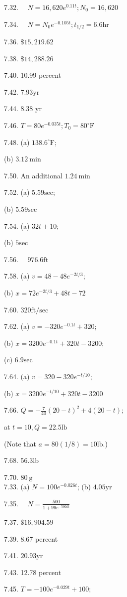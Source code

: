 \documentclass[10pt]{article}
\begin{document}
7.32. $\quad N=16,620 e^{0.11 t} ; N_{0}=16,620$

7.34. $\quad N=N_{0} e^{-0.105 t} ; t_{1 / 2}=6.6 \mathrm{hr}$

7.36. $\$ 15,219.62$

7.38. $\$ 14,288.26$

7.40. 10.99 percent

7.42. $7.93 \mathrm{yr}$

7.44. 8.38 yr

7.46. $T=80 e^{-0.035 t} ; T_{0}=80^{\circ} \mathrm{F}$

7.48. (a) $138.6^{\circ} \mathrm{F}$;

(b) $3.12 \mathrm{~min}$

7.50. An additional $1.24 \mathrm{~min}$

7.52. (a) $5.59 \mathrm{sec}$;

(b) $5.59 \mathrm{sec}$

7.54. (a) $32 t+10$;

(b) $5 \mathrm{sec}$

7.56. $\quad 976.6 \mathrm{ft}$

7.58. (a) $v=48-48 e^{-2 t / 3}$;

(b) $x=72 e^{-2 t / 3}+48 t-72$

7.60. $320 \mathrm{ft} / \mathrm{sec}$

7.62. (a) $v=-320 e^{-0.1 t}+320$;

(b) $x=3200 e^{-0.1 t}+320 t-3200$;

(c) $6.9 \mathrm{sec}$

7.64. (a) $v=320-320 e^{-t / 10}$;

(b) $x=3200 e^{-t / 10}+320 t-3200$

7.66. $Q=-\frac{7}{40}(20-t)^{2}+4(20-t)$;

at $t=10, Q=22.5 \mathrm{lb}$

(Note that $a=80(1 / 8)=10 \mathrm{lb}$.)

7.68. $56.3 \mathrm{lb}$

7.70. $80 \mathrm{~g}$\\
7.33. (a) $N=100 e^{-0.026 t}$; (b) $4.05 \mathrm{yr}$

7.35. $\quad N=\frac{500}{1+99 e^{-500 k t}}$

7.37. $\$ 16,904.59$

7.39. 8.67 percent

7.41. $20.93 \mathrm{yr}$

7.43. 12.78 percent

7.45. $T=-100 e^{-0.029 t}+100$;
\end{document}
